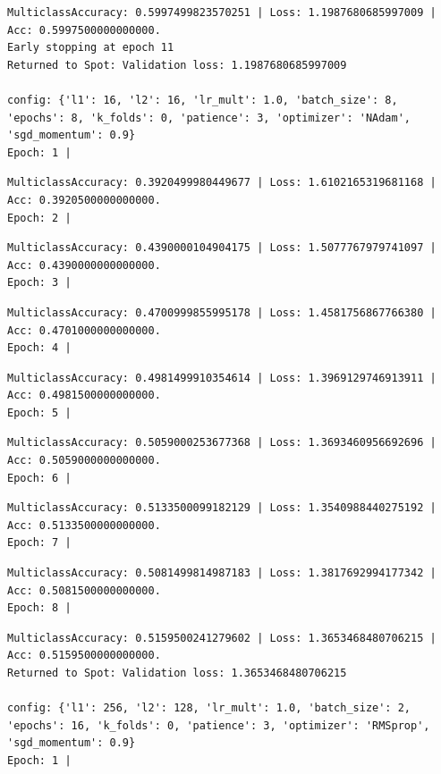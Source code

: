 \documentclass[
  letterpaper,
  DIV=11,
  numbers=noendperiod]{scrreprt}
\begin{document}
\begin{verbatim}
MulticlassAccuracy: 0.5997499823570251 | Loss: 1.1987680685997009 | Acc: 0.5997500000000000.
Early stopping at epoch 11
Returned to Spot: Validation loss: 1.1987680685997009

config: {'l1': 16, 'l2': 16, 'lr_mult': 1.0, 'batch_size': 8, 'epochs': 8, 'k_folds': 0, 'patience': 3, 'optimizer': 'NAdam', 'sgd_momentum': 0.9}
Epoch: 1 | 
\end{verbatim}

\begin{verbatim}
MulticlassAccuracy: 0.3920499980449677 | Loss: 1.6102165319681168 | Acc: 0.3920500000000000.
Epoch: 2 | 
\end{verbatim}

\begin{verbatim}
MulticlassAccuracy: 0.4390000104904175 | Loss: 1.5077767979741097 | Acc: 0.4390000000000000.
Epoch: 3 | 
\end{verbatim}

\begin{verbatim}
MulticlassAccuracy: 0.4700999855995178 | Loss: 1.4581756867766380 | Acc: 0.4701000000000000.
Epoch: 4 | 
\end{verbatim}

\begin{verbatim}
MulticlassAccuracy: 0.4981499910354614 | Loss: 1.3969129746913911 | Acc: 0.4981500000000000.
Epoch: 5 | 
\end{verbatim}

\begin{verbatim}
MulticlassAccuracy: 0.5059000253677368 | Loss: 1.3693460956692696 | Acc: 0.5059000000000000.
Epoch: 6 | 
\end{verbatim}

\begin{verbatim}
MulticlassAccuracy: 0.5133500099182129 | Loss: 1.3540988440275192 | Acc: 0.5133500000000000.
Epoch: 7 | 
\end{verbatim}

\begin{verbatim}
MulticlassAccuracy: 0.5081499814987183 | Loss: 1.3817692994177342 | Acc: 0.5081500000000000.
Epoch: 8 | 
\end{verbatim}

\begin{verbatim}
MulticlassAccuracy: 0.5159500241279602 | Loss: 1.3653468480706215 | Acc: 0.5159500000000000.
Returned to Spot: Validation loss: 1.3653468480706215

config: {'l1': 256, 'l2': 128, 'lr_mult': 1.0, 'batch_size': 2, 'epochs': 16, 'k_folds': 0, 'patience': 3, 'optimizer': 'RMSprop', 'sgd_momentum': 0.9}
Epoch: 1 | 
\end{verbatim}
\end{document}
